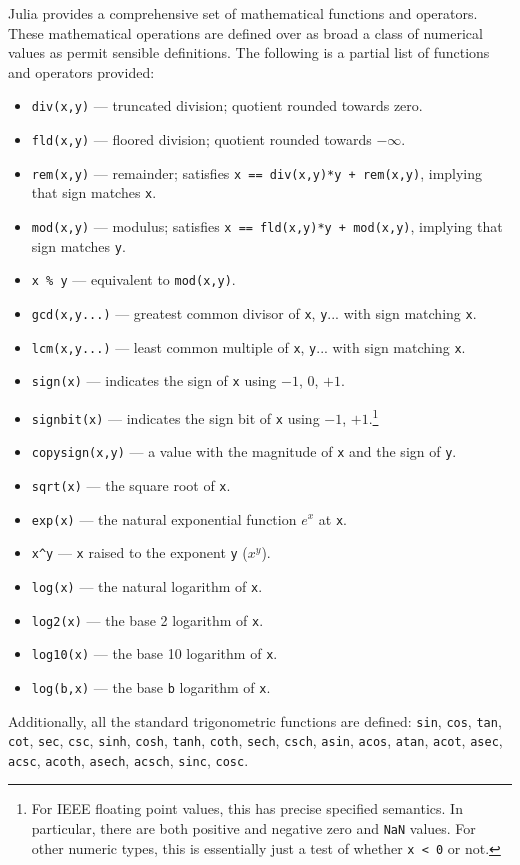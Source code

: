 \documentclass{article}
\begin{document}
Julia provides a comprehensive set of mathematical functions and operators.
These mathematical operations are defined over as broad a class of numerical values as permit sensible definitions.
The following is a partial list of functions and operators provided:
\begin{itemize}
  \item \verb|div(x,y)| --- truncated division; quotient rounded towards zero.
  \item \verb|fld(x,y)| --- floored division; quotient rounded towards $-\infty$.
  \item \verb|rem(x,y)| --- remainder; satisfies \verb|x == div(x,y)*y + rem(x,y)|, implying that sign matches \verb|x|.
  \item \verb|mod(x,y)| --- modulus; satisfies \verb|x == fld(x,y)*y + mod(x,y)|, implying that sign matches \verb|y|.
  \item \verb|x % y| --- equivalent to \verb|mod(x,y)|.
  \item \verb|gcd(x,y...)| --- greatest common divisor of \verb|x|, \verb|y|... with sign matching \verb|x|.
  \item \verb|lcm(x,y...)| --- least common multiple of \verb|x|, \verb|y|... with sign matching \verb|x|.
  \item \verb|sign(x)| --- indicates the sign of \verb|x| using $-1$, $0$, $+1$.
  \item \verb|signbit(x)| --- indicates the sign bit of \verb|x| using $-1$, $+1$.\footnote{For IEEE floating point values, this has precise specified semantics.
  In particular, there are both positive and negative zero and \texttt{NaN} values.
  For other numeric types, this is essentially just a test of whether \texttt{x < 0} or not.}
  \item \verb|copysign(x,y)| --- a value with the magnitude of \verb|x| and the sign of \verb|y|.
  \item \verb|sqrt(x)| --- the square root of \verb|x|.
  \item \verb|exp(x)| --- the natural exponential function $e^x$ at \verb|x|.
  \item \verb|x^y| --- \verb|x| raised to the exponent \verb|y| ($x^y$).
  \item \verb|log(x)| --- the natural logarithm of \verb|x|.
  \item \verb|log2(x)| --- the base 2 logarithm of \verb|x|.
  \item \verb|log10(x)| --- the base 10 logarithm of \verb|x|.
  \item \verb|log(b,x)| --- the base \verb|b| logarithm of \verb|x|.
\end{itemize}
Additionally, all the standard trigonometric functions are defined:
\verb|sin|,   \verb|cos|,   \verb|tan|,   \verb|cot|,  \verb|sec|,  \verb|csc|,
\verb|sinh|,  \verb|cosh|,  \verb|tanh|,  \verb|coth|, \verb|sech|, \verb|csch|,
\verb|asin|,  \verb|acos|,  \verb|atan|,  \verb|acot|, \verb|asec|, \verb|acsc|,
\verb|acoth|, \verb|asech|, \verb|acsch|, \verb|sinc|, \verb|cosc|.
\end{document}
